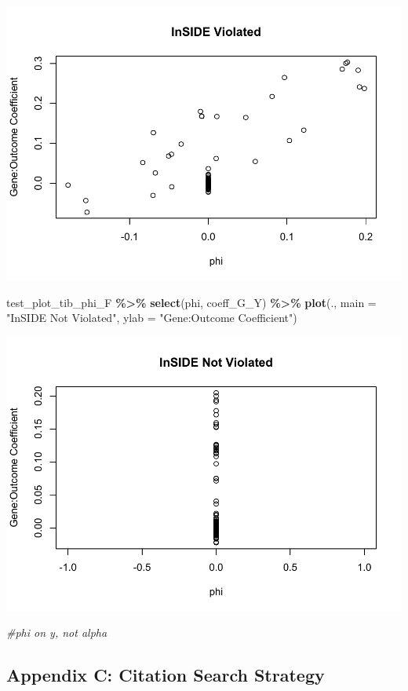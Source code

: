 \documentclass[
]{article}
\newenvironment{Shaded}{\begin{snugshade}}{\end{snugshade}}
\newcommand{\AttributeTok}[1]{\textcolor[rgb]{0.13,0.29,0.53}{#1}}
\newcommand{\CommentTok}[1]{\textcolor[rgb]{0.56,0.35,0.01}{\textit{#1}}}
\newcommand{\FunctionTok}[1]{\textcolor[rgb]{0.13,0.29,0.53}{\textbf{#1}}}
\newcommand{\NormalTok}[1]{#1}
\newcommand{\SpecialCharTok}[1]{\textcolor[rgb]{0.81,0.36,0.00}{\textbf{#1}}}
\newcommand{\StringTok}[1]{\textcolor[rgb]{0.31,0.60,0.02}{#1}}
\begin{document}
\includegraphics{9_Test_Appendices_files/figure-latex/test-plot-phi-2-1.pdf}

\begin{Shaded}
\begin{Highlighting}[]
\NormalTok{ test\_plot\_tib\_phi\_F }\SpecialCharTok{\%\textgreater{}\%}
   \FunctionTok{select}\NormalTok{(phi, coeff\_G\_Y) }\SpecialCharTok{\%\textgreater{}\%}
   \FunctionTok{plot}\NormalTok{(.,}
        \AttributeTok{main =} \StringTok{"InSIDE Not Violated"}\NormalTok{,}
        \AttributeTok{ylab =} \StringTok{"Gene:Outcome Coefficient"}\NormalTok{)}
\end{Highlighting}
\end{Shaded}

\includegraphics{9_Test_Appendices_files/figure-latex/test-plot-phi-2-2.pdf}

\begin{Shaded}
\begin{Highlighting}[]
\CommentTok{\#phi on y, not alpha}
\end{Highlighting}
\end{Shaded}

\newpage

\subsection{Appendix C: Citation Search Strategy}\label{appendix-c-citation-search-strategy}
\end{document}
